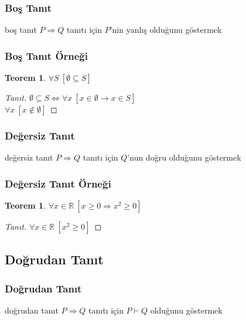 \documentclass[dvipsnames]{beamer}
\theoremstyle{definition}
\theoremstyle{example}
\theoremstyle{plain}
\newtheorem{teorem}[theorem]{Teorem}
\begin{document}
\begin{frame}
  \frametitle{Boş Tanıt}

  \begin{block}{boş tanıt}
    $P \Rightarrow Q$ tanıtı için $P$'nin yanlış olduğunu göstermek
  \end{block}
\end{frame}

\begin{frame}
  \frametitle{Boş Tanıt Örneği}

  \begin{teorem}
    $\forall S~[\emptyset \subseteq S]$
  \end{teorem}

  \pause
  \begin{proof}[Tanıt]
    $\emptyset \subseteq S \Leftrightarrow
      \forall x~[x \in \emptyset \rightarrow x \in S]$\\\pause
    $\forall x~[x \notin \emptyset]$
  \end{proof}
\end{frame}

\begin{frame}
  \frametitle{Değersiz Tanıt}

  \begin{block}{değersiz tanıt}
    $P \Rightarrow Q$ tanıtı için $Q$'nun doğru olduğunu göstermek
  \end{block}
\end{frame}

\begin{frame}
  \frametitle{Değersiz Tanıt Örneği}

  \begin{teorem}
    $\forall x \in \mathbb{R}~[x \geq 0 \Rightarrow x^2 \geq 0]$
  \end{teorem}

  \pause
  \begin{proof}[Tanıt]
    $\forall x \in \mathbb{R}~[x^2 \geq 0]$
  \end{proof}
\end{frame}

\subsection{Doğrudan Tanıt}

\begin{frame}
  \frametitle{Doğrudan Tanıt}

  \begin{block}{doğrudan tanıt}
    $P \Rightarrow Q$ tanıtı için $P \vdash Q$ olduğunu göstermek
  \end{block}
\end{frame}
\end{document}
